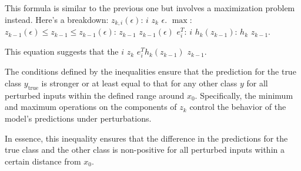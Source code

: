 This formula is similar to the previous one but involves a maximization problem instead. Here's a breakdown:
$z_{k,i}(\epsilon)$:  $i$  $z_k$  $\epsilon$.
$\max$: 
$z_{k-1}(\epsilon) \leq z_{k-1} \leq z_{k-1}(\epsilon)$:  $z_{k-1}$  $z_{k-1}(\epsilon)$ 
$e^T_i$:  $i$ 
$h_k(z_{k-1})$:  $h_k$  $z_{k-1}$.

This equation suggests that the $i$  $z_k$  $e^T_i h_k(z_{k-1})$  $z_{k-1}$.

The conditions defined by the inequalities ensure that the prediction for the true class $y_{\text{true}}$ is stronger or at least equal to that for any other class $y$ for all perturbed inputs within the defined range around $x_0$. Specifically, the minimum and maximum operations on the components of $z_k$ control the behavior of the model's predictions under perturbations.

In essence, this inequality ensures that the difference in the predictions for the true class and the other class is non-positive for all perturbed inputs within a certain distance from $x_0$.